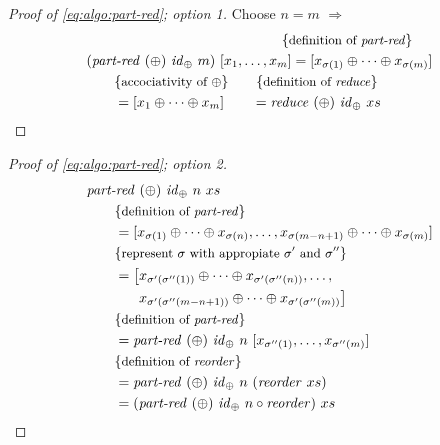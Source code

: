 \begin{proof}[Proof of \autoref{eq:algo:part-red}; option 1] Choose $n=m$ $\Rightarrow$
  \begin{align*}
    &\qquad\qquad\qquad\qquad\qquad\qquad\qquad \comment{definition of \partRed}\\
    &(\partRed\ (\oplus)\ \id_\oplus\ m)\ [x_1, \ldots, x_m] = [x_{\sigma(1)} \oplus \dots \oplus x_{\sigma(m)}]\\
    &\qquad \comment{accociativity of $\oplus$} \qquad \comment{definition of \reduce}\\
    &\qquad = [x_1 \oplus \dots \oplus x_m]\qquad = \reduce\ (\oplus)\ \id_\oplus\ xs
  \end{align*}
\end{proof}
\begin{proof}[Proof of \autoref{eq:algo:part-red}; option 2]
  \begin{align*}
    &\text{\textit{part-red}}\ (\oplus)\ \text{\textit{id}}_\oplus\ n\ xs\\
    &\qquad \{\text{\small definition of \text{\textit{part-red}}}\}\\
    &\qquad = [x_{\sigma(1)} \oplus \dots \oplus x_{\sigma(n)}, \ldots, x_{\sigma(m-n+1)} \oplus \dots \oplus x_{\sigma(m)}]\\
    &\qquad \{\text{\small represent $\sigma$ with appropiate $\sigma'$ and $\sigma''$}\}\\
    &\qquad =
      \begin{aligned}[t]
        \big[&x_{\sigma'(\sigma''(1))} \oplus \dots \oplus x_{\sigma'(\sigma''(n))}, \ldots,\\
         &x_{\sigma'(\sigma''(m-n+1))} \oplus \dots \oplus x_{\sigma'(\sigma''(m))}\big]
       \end{aligned}\\
    &\qquad \{\text{\small definition of \text{\textit{part-red}}}\}\\
    &\qquad = \text{\textit{part-red}}\ (\oplus)\ \text{\textit{id}}_\oplus\ n\ [x_{\sigma''(1)}, \ldots, x_{\sigma''(m)}]\\
    &\qquad \{\text{\small definition of \text{\textit{reorder}}}\}\\
    &\qquad = \text{\textit{part-red}}\ (\oplus)\ \text{\textit{id}}_\oplus\ n\ (\text{\textit{reorder}}\ xs)\\
    &\qquad = (\text{\textit{part-red}}\ (\oplus)\ \text{\textit{id}}_\oplus\ n \circ \text{\textit{reorder}})\ xs
  \end{align*}
\end{proof}
